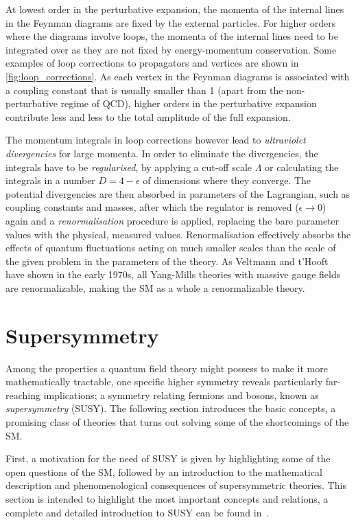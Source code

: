 At lowest order in the perturbative expansion, the momenta of the internal lines in the Feynman diagrams are fixed by the external particles. For higher orders where the diagrams involve loops, the momenta of the internal lines need to be integrated over as they are not fixed by energy-momentum conservation. Some examples of loop corrections to propagators and vertices are shown in \cref{fig:loop_corrections}. As each vertex in the Feynman diagrams is associated with a coupling constant that is usually smaller than 1 (apart from the non-perturbative regime of QCD), higher orders in the perturbative expansion contribute less and less to the total amplitude of the full expansion.

The momentum integrals in loop corrections however lead to \textit{ultraviolet divergencies} for large momenta. In order to eliminate the divergencies, the integrals have to be \textit{regularised}, \eg by applying a cut-off scale $\Lambda$ or calculating the integrals in a number $D = 4-\epsilon$ of dimensions where they converge. The potential divergencies are then absorbed in parameters of the Lagrangian, such as coupling constants and masses, after which the regulator is removed (\eg $\epsilon\rightarrow 0$) again and a \textit{renormalisation} procedure is applied, replacing the bare parameter values with the physical, measured values. Renormalisation effectively absorbs the effects of quantum fluctuations acting on much smaller scales than the scale of the given problem in the parameters of the theory.
As Veltmann and t'Hooft~\cite{THOOFT1972189,THOOFT1971173} have shown in the early 1970s, all Yang-Mills theories with massive gauge fields are renormalizable, making the SM as a whole a renormalizable theory.  

\section{Supersymmetry}

Among the properties a quantum field theory might possess to make it more mathematically tractable, one specific higher symmetry reveals particularly far-reaching implications; a symmetry relating fermions and bosons, known as \textit{supersymmetry} (SUSY). The following section introduces the basic concepts, a promising class of theories that turns out solving some of the shortcomings of the SM. 

First, a motivation for the need of SUSY is given by highlighting some of the open questions of the SM, followed by an introduction to the mathematical description and phenomenological consequences of supersymmetric theories. This section is intended to highlight the most important concepts and relations, a complete and detailed introduction to SUSY can \eg be found in~\cite{Martin:1997ns}.

